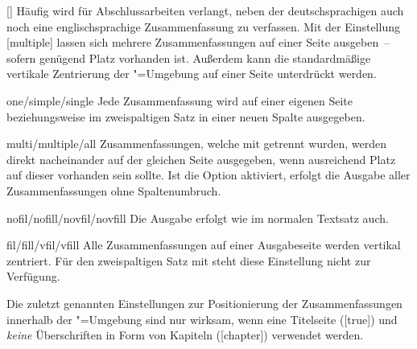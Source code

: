 \begin{Declaration}{[\PSet]}
Häufig wird für Abschlussarbeiten verlangt, neben der deutschsprachigen auch 
noch eine englischsprachige Zusammenfassung zu verfassen. Mit der Einstellung 
[multiple] lassen sich mehrere Zusammenfassungen auf einer 
Seite ausgeben~-- sofern genügend Platz vorhanden ist. Außerdem kann die 
standardmäßige vertikale Zentrierung der "=Umgebung 
auf einer Seite unterdrückt werden.
%
\begin{values}
\item[one/simple/single]
  Jede Zusammenfassung wird auf einer eigenen Seite
  beziehungsweise im zweispaltigen Satz in einer neuen Spalte ausgegeben.
\item[multi/multiple/all]
  Zusammenfassungen, welche mit  getrennt wurden, werden 
  direkt nacheinander auf der gleichen Seite ausgegeben, wenn ausreichend Platz 
  auf dieser vorhanden sein sollte. Ist die Option  aktiviert,
  erfolgt die Ausgabe aller Zusammenfassungen ohne Spaltenumbruch.
\item[nofil/nofill/novfil/novfill]
  Die Ausgabe erfolgt wie im normalen Textsatz auch.
\item[fil/fill/vfil/vfill]
  Alle Zusammenfassungen auf einer Ausgabeseite werden vertikal zentriert. Für 
  den zweispaltigen Satz mit  steht diese Einstellung nicht 
  zur Verfügung.
\end{values}
%
Die zuletzt genannten Einstellungen zur Positionierung der Zusammenfassungen 
innerhalb der "=Umgebung sind nur wirksam, wenn eine 
Titelseite ([true]) und \emph{keine} Überschriften in Form 
von Kapiteln ([chapter]) verwendet werden.
\end{Declaration}

